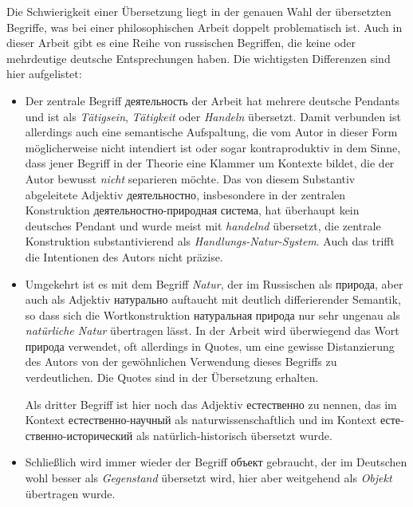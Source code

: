 \documentclass[11pt,a4paper]{article}
\begin{document}
Die Schwierigkeit einer Übersetzung liegt in der genauen Wahl der übersetzten
Begriffe, was bei einer philosophischen Arbeit doppelt problematisch ist.
Auch in dieser Arbeit gibt es eine Reihe von russischen Begriffen, die keine
oder mehrdeutige deutsche Entsprechungen haben. Die wichtigsten Differenzen
sind hier aufgelistet:
\begin{itemize}
\item Der zentrale Begriff \foreignlanguage{russian}{деятельность} der Arbeit
  hat mehrere deutsche Pendants und ist als \emph{Tätigsein}, \emph{Tätigkeit}
  oder \emph{Handeln} übersetzt. Damit verbunden ist allerdings auch eine
  semantische Aufspaltung, die vom Autor in dieser Form möglicherweise nicht
  intendiert ist oder sogar kontraproduktiv in dem Sinne, dass jener Begriff
  in der Theorie eine Klammer um Kontexte bildet, die der Autor bewusst
  \emph{nicht} separieren möchte. Das von diesem Substantiv abgeleitete
  Adjektiv \foreignlanguage{russian}{деятельностно}, insbesondere in der
  zentralen Konstruktion \foreignlanguage{russian}{деятельностно-природная
    система}, hat überhaupt kein deutsches Pendant und wurde meist mit
  \emph{handelnd} übersetzt, die zentrale Konstruktion substantivierend als
  \emph{Handlungs-Natur-System}.  Auch das trifft die Intentionen des Autors
  nicht präzise.
\item Umgekehrt ist es mit dem Begriff \emph{Natur}, der im Russischen als
  \foreignlanguage{russian}{природа}, aber auch als Adjektiv
  \foreignlanguage{russian}{натурально} auftaucht mit deutlich differierender
  Semantik, so dass sich die Wortkonstruktion
  \foreignlanguage{russian}{натуральная природа} nur sehr ungenau als
  \emph{natürliche Natur} übertragen lässt.  In der Arbeit wird überwiegend
  das Wort \foreignlanguage{russian}{природа} verwendet, oft allerdings in
  Quotes, um eine gewisse Distanzierung des Autors von der gewöhnlichen
  Verwendung dieses Begriffs zu verdeutlichen. Die Quotes sind in der
  Übersetzung erhalten.

  Als dritter Begriff ist hier noch das Adjektiv
  \foreignlanguage{russian}{естественно} zu nennen, das im Kontext
  \foreignlanguage{russian}{естественно-научный} als naturwissenschaftlich und
  im Kontext \foreignlanguage{russian}{естественно-истори\-ческий} als
  natürlich-historisch übersetzt wurde.
\item Schließlich wird immer wieder der Begriff
  \foreignlanguage{russian}{объект} gebraucht, der im Deutschen wohl besser
  als \emph{Gegenstand} übersetzt wird, hier aber weitgehend als \emph{Objekt}
  übertragen wurde.
\end{itemize}
\end{document}
